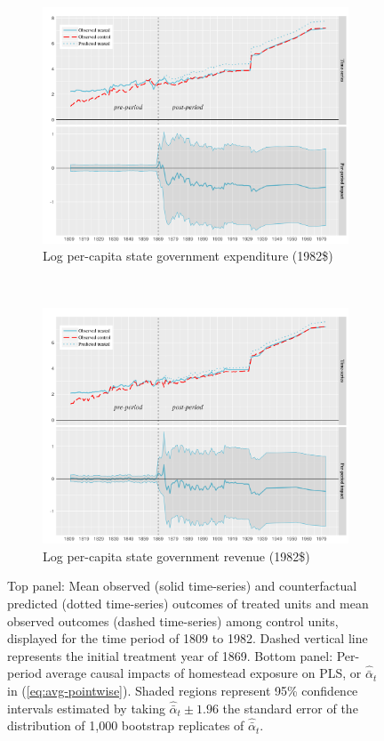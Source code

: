 \documentclass[hidelinks,12pt]{article}
\begin{document}
\begin{figure}[htbp]
	\centering
	\begin{subfigure}[t]{0.75\textwidth}
		\centering
		\includegraphics[width=\textwidth]{plots/mc-exp-pc.png}
		\caption{Log per-capita state government expenditure (1982\$)\label{mc-estimates-exp-pc}}
	\end{subfigure}
	~ 
	\begin{subfigure}[t]{0.75\textwidth}
		\centering
		\includegraphics[width=\textwidth]{plots/mc-rev-pc.png}
		\caption{Log per-capita state government revenue (1982\$)\label{mc-estimates-rev-pc}}
	\end{subfigure}
	\caption{Top panel: Mean observed (solid time-series) and counterfactual predicted (dotted time-series) outcomes of treated units and mean observed outcomes (dashed time-series) among control units, displayed for the time period of 1809 to 1982. Dashed vertical line represents the initial treatment year of 1869. Bottom panel: Per-period average causal impacts of homestead exposure on PLS, or $\hat{\bar{\alpha}}_{t}$ in (\ref{eq:avg-pointwise}). Shaded regions represent 95\% confidence intervals estimated by taking $\hat{\bar{\alpha}}_{t} \pm 1.96$ the standard error of the distribution of 1,000 bootstrap replicates of $\hat{\bar{\alpha}}_{t}$.\label{mc-estimates}} 
\end{figure}
\end{document}
